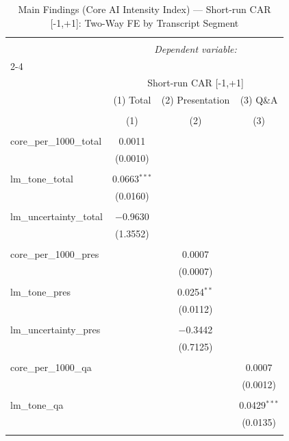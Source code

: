 
\begin{table}[!htbp] \centering 
  \caption{Main Findings (Core AI Intensity Index) — Short-run CAR [-1,+1]: Two-Way FE by Transcript Segment} 
  \label{} 
\begin{tabular}{@{\extracolsep{5pt}}lccc} 
\\[-1.8ex]\hline 
\hline \\[-1.8ex] 
 & \multicolumn{3}{c}{\textit{Dependent variable:}} \\ 
\cline{2-4} 
\\[-1.8ex] & \multicolumn{3}{c}{Short-run CAR [-1,+1]} \\ 
 & (1) Total & (2) Presentation & (3) Q\&A \\ 
\\[-1.8ex] & (1) & (2) & (3)\\ 
\hline \\[-1.8ex] 
 core\_per\_1000\_total & 0.0011 &  &  \\ 
  & (0.0010) &  &  \\ 
  & & & \\ 
 lm\_tone\_total & 0.0663$^{***}$ &  &  \\ 
  & (0.0160) &  &  \\ 
  & & & \\ 
 lm\_uncertainty\_total & $-$0.9630 &  &  \\ 
  & (1.3552) &  &  \\ 
  & & & \\ 
 core\_per\_1000\_pres &  & 0.0007 &  \\ 
  &  & (0.0007) &  \\ 
  & & & \\ 
 lm\_tone\_pres &  & 0.0254$^{**}$ &  \\ 
  &  & (0.0112) &  \\ 
  & & & \\ 
 lm\_uncertainty\_pres &  & $-$0.3442 &  \\ 
  &  & (0.7125) &  \\ 
  & & & \\ 
 core\_per\_1000\_qa &  &  & 0.0007 \\ 
  &  &  & (0.0012) \\ 
  & & & \\ 
 lm\_tone\_qa &  &  & 0.0429$^{***}$ \\ 
  &  &  & (0.0135) \\ 
  & & & \\ 

\end{tabular}
\end{table}
